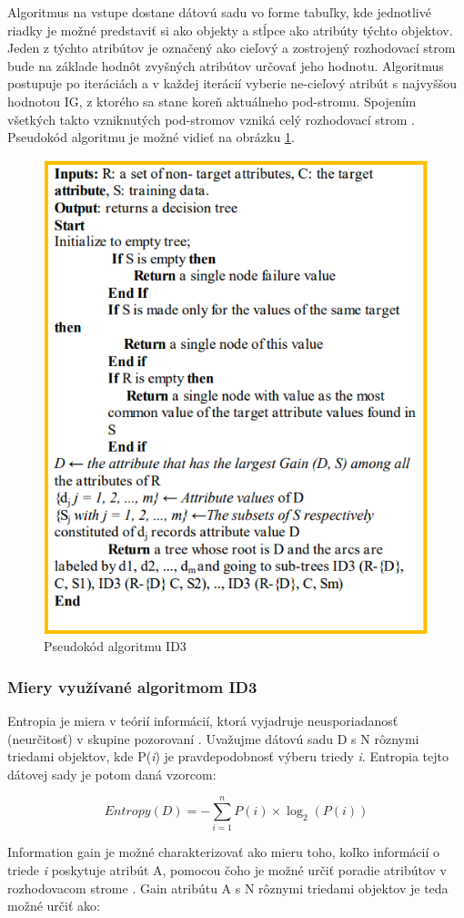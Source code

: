 \documentclass[slovak, master]{diploma}
\begin{document}
Algoritmus na vstupe dostane dátovú sadu vo forme tabuľky, kde jednotlivé riadky je možné predstaviť si ako objekty a stĺpce ako atribúty týchto objektov. Jeden z týchto atribútov je označený ako cieľový a zostrojený rozhodovací strom bude na základe hodnôt zvyšných atribútov určovať jeho hodnotu. Algoritmus postupuje po iteráciách a v každej iterácií vyberie ne-cieľový atribút s najvyššou hodnotou IG, z ktorého sa stane koreň aktuálneho pod-stromu. Spojením všetkých takto vzniknutých pod-stromov vzniká celý rozhodovací strom \cite{hssina2014comparative}. Pseudokód algoritmu je možné vidieť na obrázku \ref{pic:id3Pseudo}.

\begin{figure}[!htb]
    \centering
    \includegraphics[width=.55\textwidth]{Figures/id3Pseudo.png}
    \caption{Pseudokód algoritmu ID3 \cite{hssina2014comparative}}
    \label{pic:id3Pseudo}
\end{figure}

\subsubsection*{Miery využívané algoritmom ID3}
\label{sec:ID3miery}
Entropia je miera v teórií informácií, ktorá vyjadruje neusporiadanosť (neurčitosť) v skupine pozorovaní \cite{EntropyAndGain}. Uvažujme dátovú sadu D s N rôznymi triedami objektov, kde P(\textit{i}) je pravdepodobnosť výberu triedy \textit{i}. Entropia tejto dátovej sady je potom daná vzorcom: 

\[Entropy(D) = -\displaystyle\sum\limits_{i=1}^n P(i) \times \log_2(P(i))\]

Information gain je možné charakterizovať ako mieru toho, koľko informácií o triede \textit{i} poskytuje atribút A, pomocou čoho je možné určiť poradie atribútov v rozhodovacom strome \cite{EntropyAndGain}. Gain atribútu A s N rôznymi triedami objektov je teda možné určiť ako:
\end{document}
